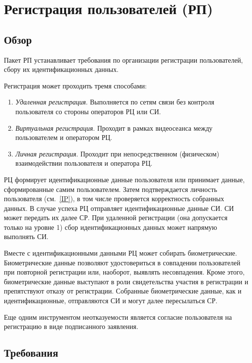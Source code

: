 \section{Регистрация пользователей (РП)}\label{UR}

\subsection{Обзор}\label{UR.Intro}

Пакет РП устанавливает требования по организации регистрации пользователей,
сбору их идентификационных данных.

Регистрация может проходить тремя способами:
\begin{enumerate}
\item
{\it Удаленная регистрация}. 
Выполняется по сетям связи без контроля пользователя со стороны операторов РЦ 
или СИ.
\item
{\it Виртуальная регистрация}. 
Проходит в рамках видеосеанса между пользователем и оператором РЦ. 
\item
{\it Личная регистрация}. 
Проходит при непосредственном (физическом) взаимодействии пользователя и 
оператора РЦ.
\end{enumerate}

РЦ формирует идентификационные данные пользователя или принимает данные, 
сформированные самим пользователем. Затем подтверждается личность пользователя
(см.~\ref{IP}), в том числе проверяется корректность собранных данных. В случае 
успеха РЦ отправляет идентификационные данные СИ. СИ может передать их далее СР.
%
При удаленной регистрации (она допускается только на уровне 1) сбор 
идентификационных данных может напрямую выполнять СИ.

Вместе с идентификационными данными РЦ может собирать биометрические.
Биометрические данные позволяют удостовериться в совпадении пользователей при 
повторной регистрации или, наоборот, выявлять несовпадения. 
%
Кроме этого, биометрические данные выступают в роли свидетельства участия в 
регистрации и препятствуют отказу от регистрации. 
%
Собранные биометрические данные, как и идентификационные, отправляются СИ и 
могут далее пересылаться СР.

Еще одним инструментом неотказуемости является согласие пользователя на 
регистрацию в виде подписанного заявления.

\subsection{Требования}\label{UR.Reqs}

